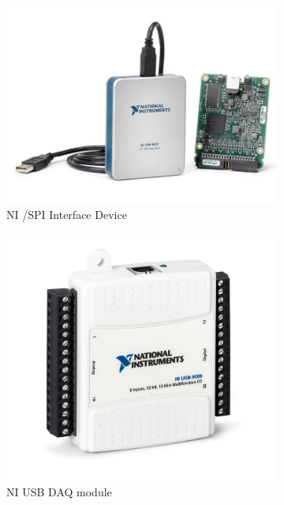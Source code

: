 \begin{figure}[h]
	\centering
	\begin{subfigure}{.5\textwidth}
		\centering
		\includegraphics[width=.95\linewidth]{img/ni-i2c-device.jpg}
		\caption{NI \IIC/SPI Interface Device}
	\end{subfigure}%
	\begin{subfigure}{.5\textwidth}
		\centering
		\includegraphics[width=.95\linewidth]{img/nidaq.jpg}
		\caption{NI USB DAQ module}
	\end{subfigure}
	\begin{subfigure}{.5\textwidth}
		\centering

\end{subfigure}
\end{figure}
